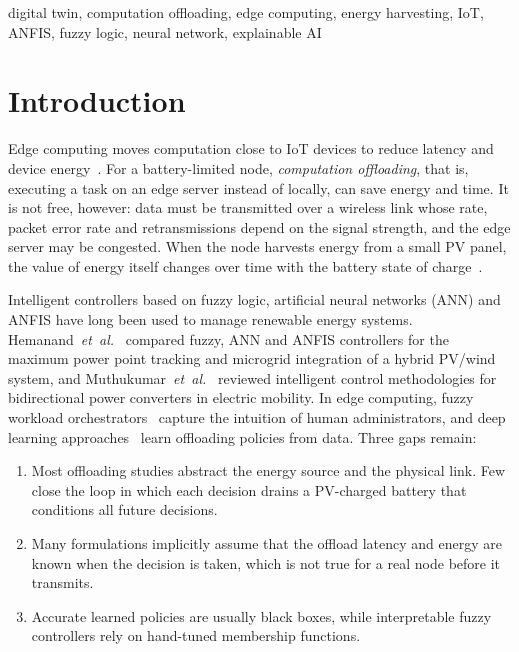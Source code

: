 \documentclass[conference]{IEEEtran}
\begin{document}
\begin{IEEEkeywords}
digital twin, computation offloading, edge computing, energy harvesting, IoT, ANFIS, fuzzy logic, neural network, explainable AI
\end{IEEEkeywords}

\section{Introduction}
Edge computing moves computation close to IoT devices to reduce latency and device energy~\cite{shi2016edge,mao2017survey}.
For a battery-limited node, \emph{computation offloading}, that is, executing a task on an edge server instead of locally, can save
energy and time. It is not free, however: data must be transmitted over a wireless link whose rate, packet error rate and
retransmissions depend on the signal strength, and the edge server may be congested. When the node harvests energy from a small
PV panel, the value of energy itself changes over time with the battery state of charge~\cite{mao2016dynamic,huang2020drl}.

Intelligent controllers based on fuzzy logic, artificial neural networks (ANN) and ANFIS have long been used to manage
renewable energy systems. Hemanand~\emph{et~al.}~\cite{hemanand2018comparative} compared fuzzy, ANN and ANFIS controllers for the
maximum power point tracking and microgrid integration of a hybrid PV/wind system, and Muthukumar~\emph{et~al.}~\cite{muthukumar2024comparative}
reviewed intelligent control methodologies for bidirectional power converters in electric mobility. In edge computing, fuzzy
workload orchestrators~\cite{sonmez2019fuzzy,nguyen2020flexible} capture the intuition of human administrators, and deep
learning approaches~\cite{huang2020drl} learn offloading policies from data. Three gaps remain:
\begin{enumerate}
  \item Most offloading studies abstract the energy source and the physical link. Few close the loop in which each decision drains
        a PV-charged battery that conditions all future decisions.
  \item Many formulations implicitly assume that the offload latency and energy are known when the decision is taken, which is not
        true for a real node before it transmits.
  \item Accurate learned policies are usually black boxes, while interpretable fuzzy controllers rely on hand-tuned membership
        functions.
\end{enumerate}
\end{document}
